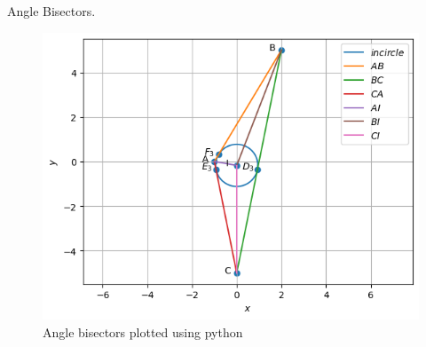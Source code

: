 \begin{table}[H]
        \centering
        
        \caption{Angle Bisectors.}
        \label{tab:Angle_bisector}
    \end{table}
\begin{figure}[H]
\includegraphics[width=\columnwidth]{1.5/figs/Incentre.png}
\caption{Angle bisectors plotted using python}
\label{fig:i_angle_bisector_py}
\end{figure}
